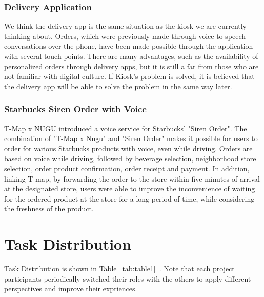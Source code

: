 \documentclass[conference,compsoc]{IEEEtran}
\begin{document}
\subsubsection{Delivery Application}
We think the delivery app is the same situation as the kiosk we are currently thinking about. Orders, which were previously made through voice-to-speech conversations over the phone, have been made possible through the application with several touch points. There are many advantages, such as the availability of personalized orders through delivery apps, but it is still a far from those who are not familiar with digital culture. If Kiosk's problem is solved, it is believed that the delivery app will be able to solve the problem in the same way later.

\subsubsection{Starbucks Siren Order with Voice}
T-Map x NUGU introduced a voice service for Starbucks' "Siren Order". The combination of "T-Map x Nugu" and "Siren Order" makes it possible for users to order for various Starbucks products with voice, even while driving. Orders are based on voice while driving, followed by beverage selection, neighborhood store selection, order product confirmation, order receipt and payment. In addition, linking T-map, by forwarding the order to the store within five minutes of arrival at the designated store, users were able to improve the inconvenience of waiting for the ordered product at the store for a long period of time, while considering the freshness of the product.

\section{Task Distribution}

Task Distribution is shown in Table~\ref{tab:table1}\ . Note that each project participants periodically switched their roles with the others to apply different perspectives and improve their expriences.
\end{document}
